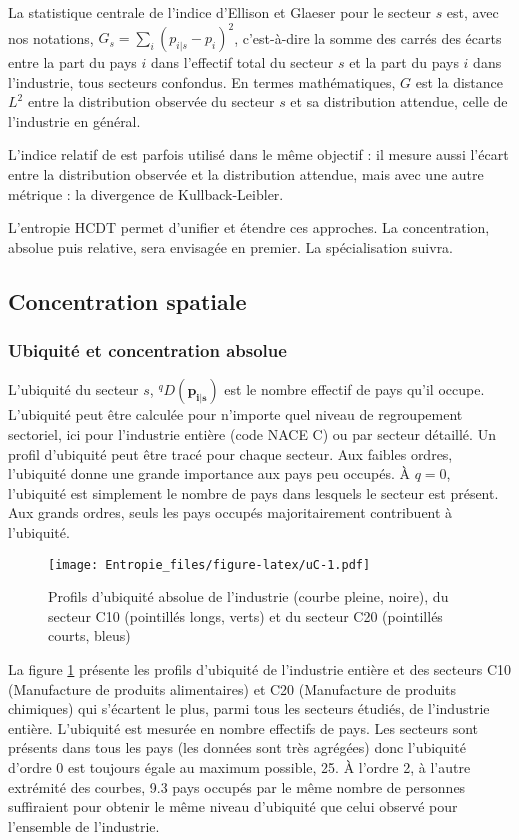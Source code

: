 \documentclass[fleqn,10pt]{ArtEcoFoG} %
\begin{document}
La statistique centrale de l'indice d'Ellison et Glaeser pour le secteur
\(s\) est, avec nos notations, \(G_s=\sum_i{(p_{i|s} - p_i)^2}\),
c'est-à-dire la somme des carrés des écarts entre la part du pays \(i\)
dans l'effectif total du secteur \(s\) et la part du pays \(i\) dans
l'industrie, tous secteurs confondus. En termes mathématiques, \(G\) est
la distance \(L^2\) entre la distribution observée du secteur \(s\) et
sa distribution attendue, celle de l'industrie en général.

L'indice relatif de \citet{Theil1967} est parfois utilisé dans le même
objectif \citep{Cutrini2009}: il mesure aussi l'écart entre la
distribution observée et la distribution attendue, mais avec une autre
métrique : la divergence de Kullback-Leibler.

L'entropie HCDT permet d'unifier et étendre ces approches. La
concentration, absolue puis relative, sera envisagée en premier. La
spécialisation suivra.

\subsection{Concentration spatiale}\label{concentration-spatiale}

\subsubsection{Ubiquité et concentration
absolue}\label{ubiquite-et-concentration-absolue}

L'ubiquité du secteur \(s\), \(^{q}D(\mathbf{p_{i|s}})\) est le nombre
effectif de pays qu'il occupe. L'ubiquité peut être calculée pour
n'importe quel niveau de regroupement sectoriel, ici pour l'industrie
entière (code NACE C) ou par secteur détaillé. Un profil d'ubiquité peut
être tracé pour chaque secteur. Aux faibles ordres, l'ubiquité donne une
grande importance aux pays peu occupés. À \(q=0\), l'ubiquité est
simplement le nombre de pays dans lesquels le secteur est présent. Aux
grands ordres, seuls les pays occupés majoritairement contribuent à
l'ubiquité.

\begin{figure}
\centering
\texttt{[image: Entropie\_files/figure-latex/uC-1.pdf]}
\caption{\label{fig:uC}Profils d'ubiquité absolue de l'industrie (courbe
pleine, noire), du secteur C10 (pointillés longs, verts) et du secteur
C20 (pointillés courts, bleus)}
\end{figure}

La figure \ref{fig:uC} présente les profils d'ubiquité de l'industrie
entière et des secteurs C10 (Manufacture de produits alimentaires) et
C20 (Manufacture de produits chimiques) qui s'écartent le plus, parmi
tous les secteurs étudiés, de l'industrie entière. L'ubiquité est
mesurée en nombre effectifs de pays. Les secteurs sont présents dans
tous les pays (les données sont très agrégées) donc l'ubiquité d'ordre 0
est toujours égale au maximum possible, 25. À l'ordre 2, à l'autre
extrémité des courbes, 9.3 pays occupés par le même nombre de personnes
suffiraient pour obtenir le même niveau d'ubiquité que celui observé
pour l'ensemble de l'industrie.
\end{document}
